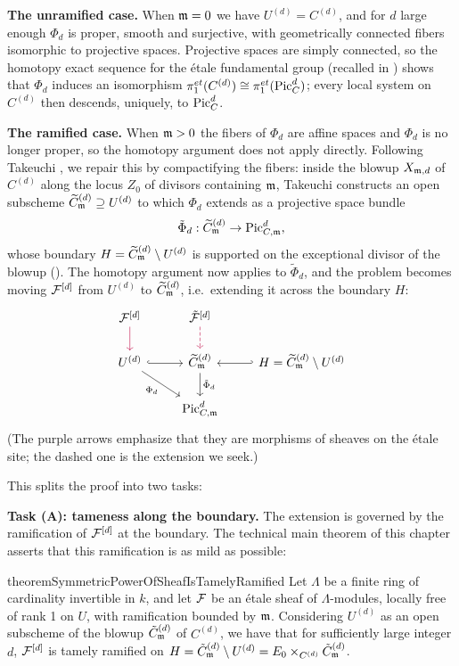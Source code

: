 \textbf{The unramified case.} When $\mdls = 0$ we have $U^{(d)} = C^{(d)}$,
and for $d$ large enough $\Phi_d$ is proper, smooth and surjective, with
geometrically connected fibers isomorphic to projective spaces. Projective
spaces are simply connected, so the homotopy exact sequence for the \'etale
fundamental group (recalled in ) shows that
$\Phi_d$ induces an isomorphism $\pi_1^{et}(C^{(d)}) \cong
\pi_1^{et}(\PicC[d])$; every local system on $C^{(d)}$ then descends,
uniquely, to $\PicC[d]$.

\textbf{The ramified case.} When $\mdls > 0$ the fibers of $\Phi_d$ are
affine spaces and $\Phi_d$ is no longer proper, so the homotopy argument does
not apply directly. Following Takeuchi \cite{takeuchi2018blow}, we repair
this by compactifying the fibers: inside the blowup $X_{\mdls,d}$ of
$C^{(d)}$ along the locus $Z_0$ of divisors containing $\mdls$, Takeuchi
constructs an open subscheme $\Cmod{d} \supseteq U^{(d)}$ to which $\Phi_d$
extends as a projective space bundle
$$ \tilde{\Phi}_d : \Cmod{d} \to \PicCm[d], $$
whose boundary $H = \Cmod{d} \setminus U^{(d)}$ is supported on the
exceptional divisor of the blowup ().
The homotopy argument now applies to $\tilde{\Phi}_d$, and the problem
becomes moving $\cF^{[d]}$ from $U^{(d)}$ to $\Cmod{d}$, i.e.\ extending it
across the boundary $H$:
\[
\begin{tikzcd}
\cF^{[d]} \arrow[d, purple] & \tilde{\cF}^{[d]} \arrow[d, purple, dashed] & \\
U^{(d)} \arrow[r, hook] \arrow[rd, "\Phi_d"'] & \Cmod{d} \arrow[d, "\tilde{\Phi}_d"] & H = \Cmod{d} \setminus U^{(d)} \arrow[l, hook'] \\
& \PicCm[d] &
\end{tikzcd}
\]
(The purple arrows emphasize that they are morphisms of sheaves on the
\'etale site; the dashed one is the extension we seek.)

This splits the proof into two tasks:

\textbf{Task (A): tameness along the boundary.} The extension is governed by
the ramification of $\cF^{[d]}$ at the boundary. The technical main theorem
of this chapter asserts that this ramification is as mild as possible:

\begin{restatable}{theorem}{SymmetricPowerOfSheafIsTamelyRamified}\label{theorem:SymmetricPowerOfSheafIsTamelyRamified}
     Let $\Lambda$ be a finite ring of cardinality invertible in $k$, and let $\cF$ be an \'etale sheaf of $\Lambda$-modules, locally free of rank 1 on $U$, with ramification bounded by $\mdls$.
     Considering $U^{(d)}$ as an open subscheme of the blowup $\tilde{C}^{(d)}_\mdls$ of $C^{(d)}$, we have that
     for sufficiently large integer $d$, $\cF^{[d]}$ is tamely ramified on $H= \tilde{C}^{(d)}_\mdls \setminus U^{(d)}=E_0 \times_{C^{(d)}} \tilde{C}^{(d)}_\mdls $.
\end{restatable}

